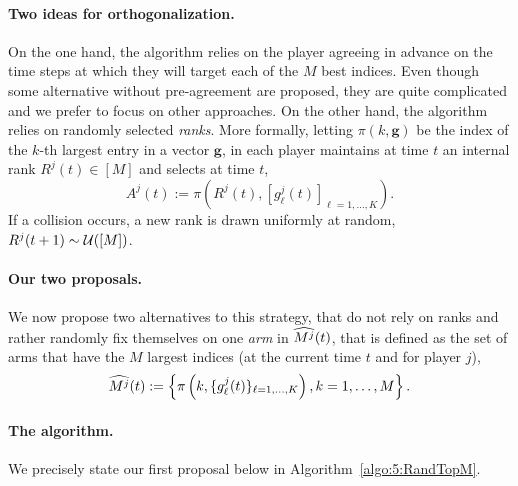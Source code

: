 \paragraph{Two ideas for orthogonalization.}
\label{par:5:twoIdeasOrthogonalization}
%
On the one hand, the \TDFS{} algorithm \citep{Zhao10} relies on the player agreeing in advance on the time steps at which they will target each of the $M$ best indices.
Even though some alternative without pre-agreement are proposed, they are quite complicated and we prefer to focus on other approaches.
%
On the other hand, the \rhoRand{} algorithm \citep{Anandkumar11} relies on randomly selected \emph{ranks}. %
%
More formally, letting $\pi(k,\mathbf{g})$ be the index of the $k$-th largest entry in a vector $\mathbf{g}$,
in \rhoRand{} each player maintains at time $t$ an internal rank $R^j(t)\in[M]$
and selects at time $t$,
\begin{equation}
  A^j(t) := \pi\left(R^j(t), [g^j_\ell(t)]_{\ell=1,\dots,K}\right).
\end{equation}
If a collision occurs, a new rank is drawn uniformly at random, $R^j(t+1) \sim \mathcal{U}([M])$.


\paragraph{Our two proposals.}
We now propose two alternatives to this strategy, that do not rely on ranks and rather randomly fix themselves on one \emph{arm} in $\widehat{M^j}(t)$, that is defined as the set of arms that have the $M$ largest indices (at the current time $t$ and for player $j$),
\begin{equation}
  \widehat{M^j}(t) := \left\{ \pi\left(k, \{g^j_\ell(t)\}_{\ell=1,\dots,K}\right), k=1,\dots,M\right\}.
\end{equation}


\paragraph{The \RandTopM{} algorithm.}
%
We precisely state our first proposal below in Algorithm~\ref{algo:5:RandTopM}.

